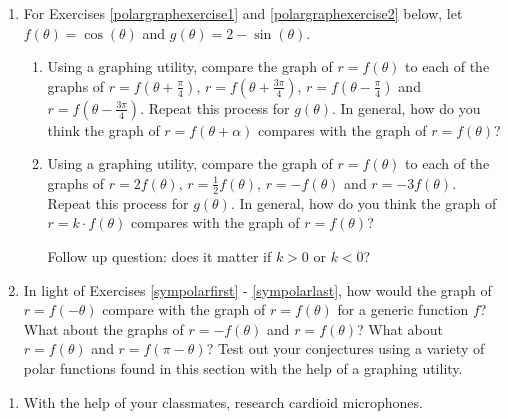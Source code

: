 \documentclass{ximera}
\begin{document}
\begin{enumerate}

\setcounter{enumi}{\value{HW}}

\item  For Exercises \ref{polargraphexercise1} and \ref{polargraphexercise2} below, let  $f(\theta) = \cos(\theta)$ and $g(\theta) = 2-\sin(\theta)$. \label{polargraphtransformations}

\begin{enumerate}

\item  Using a graphing utility, compare the graph of $r = f(\theta)$ to each of the graphs of $r = f\left(\theta  + \frac{\pi}{4}\right)$, $r = f\left(\theta  + \frac{3\pi}{4}\right)$, $r = f\left(\theta  - \frac{\pi}{4}\right)$ and $r = f\left(\theta  - \frac{3\pi}{4}\right)$.  Repeat this process for $g(\theta)$.  In general, how do you think the graph of $r = f(\theta + \alpha)$ compares with the graph of $r = f(\theta)$?
\label{polargraphexercise1}

\item  Using a graphing utility, compare the graph of $r = f(\theta)$ to each of the graphs of $r = 2f\left(\theta\right)$, $r = \frac{1}{2} f\left(\theta\right)$, $r = -f\left(\theta\right)$ and $r = -3 f(\theta)$.  Repeat this process for $g(\theta)$.  In general, how do you think the graph of $r = k \cdot f(\theta)$ compares with the graph of $r = f(\theta)$? 

Follow up question:  does it matter if $k>0$ or $k<0$?
\label{polargraphexercise2}

\end{enumerate}

\item In light of Exercises \ref{sympolarfirst} - \ref{sympolarlast}, how would the graph of $r = f(-\theta)$ compare with the graph of $r = f(\theta)$ for a generic function $f$?  What about the graphs of $r = -f(\theta)$ and $r = f(\theta)$?  What about $r = f(\theta)$ and $r = f(\pi - \theta)$?  Test out your conjectures using a variety of polar functions found in this section with the help of a graphing utility.

\setcounter{HW}{\value{enumi}}

\end{enumerate}


\begin{enumerate}

\setcounter{enumi}{\value{HW}}

\item With the help of your classmates, research cardioid microphones.


\setcounter{HW}{\value{enumi}}

\end{enumerate}
\end{document}
